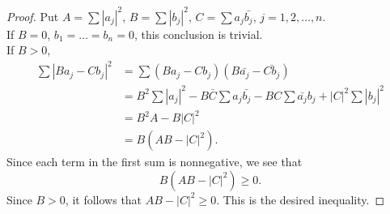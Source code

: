 \begin{proof}
    Put $A = \sum |a_j|^2$, $B = \sum |b_j|^2$, $C = \sum a_j \bar{b_j}$, $j = 1,2,\dots,n$. \\    
    If $B = 0$, $b_1 = \dots = b_n = 0$, this conclusion is trivial.\\
    If $B > 0$, 
    \begin{align*}
        \sum \left|B a_j - C b_j\right|^2
        &= \sum (B a_j-C b_j)(B \bar{a_j} - \bar{C b_j})\\
        &= B^2\sum \left|a_j\right|^2 - B\bar{C}\sum a_j \bar{b_j} - BC \sum \bar{a_j} b_j + \left|C\right|^2\sum |b_j|^2\\
        &= B^2A-B|C|^2\\
        &= B(AB-|C|^2).
    \end{align*}
    Since each term in the first sum is nonnegative, we see that
    \begin{equation*}
        B(AB-|C|^2) \geq 0.
    \end{equation*}
    Since $B>0$, it follows that $AB-|C|^2 \geq 0$. This is the desired inequality.
\end{proof}

